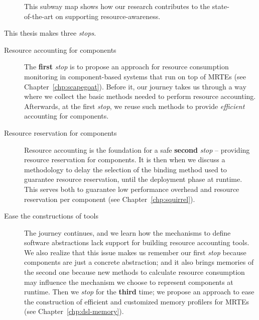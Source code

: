 {\begin{figure}[!ht]
\caption{This subway map shows how our research contributes to the state-of-the-art on supporting resource-awareness.} \label{fig:subway-map}
\end{figure}

}


This thesis makes three \textit{stops}.
\begin{description}
\item[Resource accounting for components] The \textbf{first} \textit{stop} is to propose an approach for resource consumption monitoring in component-based systems that run on top of MRTEs (see  Chapter~\ref{chp:scapegoat}).
Before it, our journey takes us through a way where we collect the basic methods needed to perform resource accounting.
Afterwards, at the first \textit{stop}, we reuse such methods to provide \textit{efficient} accounting for components.

\item[Resource reservation for components] Resource accounting is the foundation for a safe \textbf{second} \textit{stop} -- providing resource reservation for components.
It is then when we discuss a methodology to delay the selection of the binding method used to guarantee resource reservation, until the deployment phase at runtime.
This serves both to guarantee low performance overhead and resource reservation per component (see  Chapter~\ref{chp:squirrel}).

\item[Ease the constructions of tools] The journey continues, and we learn how the mechanisms to define software abstractions lack support for building resource accounting tools.
We also realize that this issue makes us remember our first \textit{stop} because components are just a concrete abstraction; and it also brings memories of the second one because new methods to calculate resource consumption may influence the mechanism we choose to represent components at runtime. 
Then we \textit{stop} for the \textbf{third} time; we propose an approach to ease the construction of efficient and customized memory profilers for MRTEs (see  Chapter~\ref{chp:dsl-memory}).
\end{description}

\newpage\thispagestyle{empty}\addtocounter{page}{-1}




